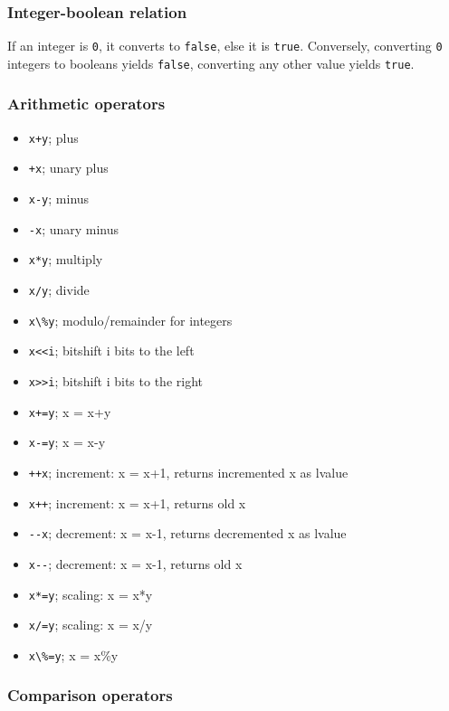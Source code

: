 \documentclass[8pt, table, xcdraw]{article}%
\begin{document}
\subsubsection{Integer-boolean relation}
If an integer is \lstinline{0}, it converts to \lstinline{false}, else it is \lstinline{true}. Conversely, converting \lstinline{0} integers to booleans yields \lstinline{false}, converting any other value yields \lstinline{true}.

\subsubsection{Arithmetic operators}

\begin{itemize}[leftmargin=15pt,noitemsep,nolistsep]
\item \lstinline{x+y}; plus
\item \lstinline{+x}; unary plus
\item \lstinline{x-y}; minus
\item \lstinline{-x}; unary minus
\item \lstinline{x*y}; multiply
\item \lstinline{x/y}; divide
\item \lstinline{x\%y}; modulo/remainder for integers
\item \lstinline{x<<i}; bitshift i bits to the left
\item \lstinline{x>>i}; bitshift i bits to the right

\item \lstinline{x+=y}; x = x+y
\item \lstinline{x-=y}; x = x-y
\item \lstinline{++x}; increment: x = x+1, returns incremented x as lvalue
\item \lstinline{x++}; increment: x = x+1, returns old x
\item \lstinline{--x}; decrement: x = x-1, returns decremented x as lvalue
\item \lstinline{x--}; decrement: x = x-1, returns old x
\item \lstinline{x*=y}; scaling: x = x*y
\item \lstinline{x/=y}; scaling: x = x/y
\item \lstinline{x\%=y}; x = x\%y
\end{itemize}

\subsubsection{Comparison operators}
\end{document}
